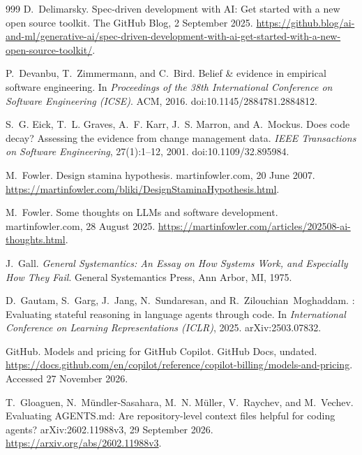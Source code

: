 \documentclass[11pt,a4paper]{article}
\begin{document}
\begin{thebibliography}{999}
D.~Delimarsky.
\newblock Spec-driven development with {AI}: Get started with a new open
source toolkit.
\newblock The GitHub Blog, 2 September 2025.
\newblock \url{https://github.blog/ai-and-ml/generative-ai/spec-driven-development-with-ai-get-started-with-a-new-open-source-toolkit/}.

P.~Devanbu, T.~Zimmermann, and C.~Bird.
\newblock Belief \& evidence in empirical software engineering.
\newblock In \emph{Proceedings of the 38th International Conference on Software
Engineering (ICSE)}. ACM, 2016.
\newblock doi:10.1145/2884781.2884812.

S.~G. Eick, T.~L. Graves, A.~F. Karr, J.~S. Marron, and A.~Mockus.
\newblock Does code decay? {A}ssessing the evidence from change management data.
\newblock \emph{IEEE Transactions on Software Engineering}, 27(1):1--12, 2001.
\newblock doi:10.1109/32.895984.

M.~Fowler.
\newblock Design stamina hypothesis.
\newblock martinfowler.com, 20 June 2007.
\newblock \url{https://martinfowler.com/bliki/DesignStaminaHypothesis.html}.

M.~Fowler.
\newblock Some thoughts on {LLMs} and software development.
\newblock martinfowler.com, 28 August 2025.
\newblock \url{https://martinfowler.com/articles/202508-ai-thoughts.html}.

J.~Gall.
\newblock \emph{General Systemantics: An Essay on How Systems Work, and
Especially How They Fail}.
\newblock General Systemantics Press, Ann Arbor, MI, 1975.

D.~Gautam, S.~Garg, J.~Jang, N.~Sundaresan, and R.~Zilouchian~Moghaddam.
: Evaluating stateful reasoning in language agents
through code.
\newblock In \emph{International Conference on Learning Representations
(ICLR)}, 2025.
\newblock arXiv:2503.07832.

GitHub.
\newblock Models and pricing for GitHub Copilot.
\newblock GitHub Docs, undated.
\newblock \url{https://docs.github.com/en/copilot/reference/copilot-billing/models-and-pricing}.
\newblock Accessed 27 November 2026.

T.~Gloaguen, N.~M\"undler-Sasahara, M.~N. M\"uller, V.~Raychev, and M.~Vechev.
\newblock Evaluating {AGENTS.md}: Are repository-level context files helpful
for coding agents?
\newblock arXiv:2602.11988v3, 29 September 2026.
\newblock \url{https://arxiv.org/abs/2602.11988v3}.


\end{thebibliography}
\end{document}
